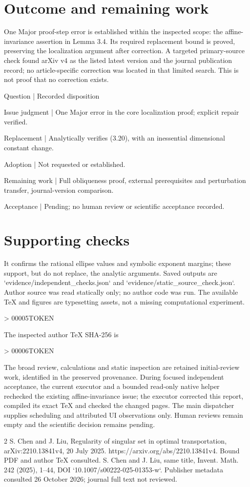 \documentclass[10pt]{article}
\begin{document}
\section*{Outcome and remaining work}
One Major proof-step error is established within the inspected scope: the affine-invariance assertion in Lemma 3.4. Its required replacement bound is proved, preserving the localization argument after correction. A targeted primary-source check found arXiv v4 as the listed latest version and the journal publication record; no article-specific correction was located in that limited search. This is not proof that no correction exists.\par
Question | Recorded disposition\par
Issue judgment | One Major error in the core localization proof; explicit repair verified.\par
Replacement | Analytically verifies (3.20), with an inessential dimensional constant change.\par
Adoption | Not requested or established.\par
Remaining work | Full obliqueness proof, external prerequisites and perturbation transfer, journal-version comparison.\par
Acceptance | Pending; no human review or scientific acceptance recorded.\par
\section*{Supporting checks}
It confirms the rational ellipse values and symbolic exponent margins; these support, but do not replace, the analytic arguments. Saved outputs are `evidence/independent\_checks.json` and `evidence/static\_source\_check.json`. Author source was read statically only; no author code was run. The available TeX and figures are typesetting assets, not a missing computational experiment.\par
> 00005TOKEN\par
The inspected author TeX SHA-256 is\par
> 00006TOKEN\par
The broad review, calculations and static inspection are retained initial-review work, identified in the preserved provenance. During focused independent acceptance, the current executor and a bounded read-only native helper rechecked the existing affine-invariance issue; the executor corrected this report, compiled its exact TeX and checked the changed pages. The main dispatcher supplies scheduling and attributed UI observations only. Human reviews remain empty and the scientific decision remains pending.\par
2 S. Chen and J. Liu, Regularity of singular set in optimal transportation, arXiv:2210.13841v4, 20 July 2025. https://arxiv.org/abs/2210.13841v4. Bound PDF and author TeX consulted. S. Chen and J. Liu, same title, Invent. Math. 242 (2025), 1–44, DOI `10.1007/s00222-025-01353-w`. Publisher metadata consulted 26 October 2026; journal full text not reviewed.\par
\end{document}
